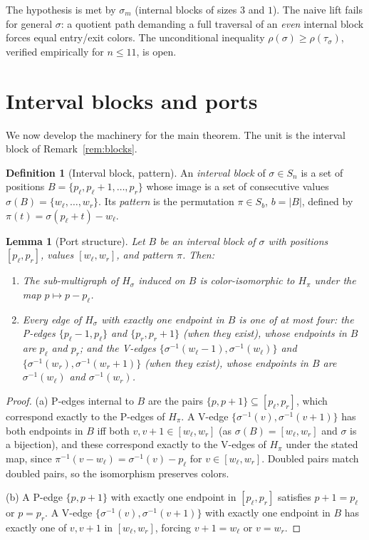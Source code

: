 \documentclass[11pt]{article}
\newtheorem{lemma}[theorem]{Lemma}
\theoremstyle{definition}
\newtheorem{definition}[theorem]{Definition}
\newcommand{\inv}[1]{#1^{-1}}
\begin{document}
The hypothesis is met by $\sigma_m$ (internal blocks of sizes $3$ and $1$). The naive
lift fails for general $\sigma$: a quotient path demanding a full traversal of an
\emph{even} internal block forces equal entry/exit colors. The unconditional inequality
$\rho(\sigma)\ge\rho(\tau_\sigma)$, verified empirically for $n\le11$, is open.

\section{Interval blocks and ports}\label{sec:ports}

We now develop the machinery for the main theorem. The unit is the interval block of
Remark~\ref{rem:blocks}.

\begin{definition}[Interval block, pattern]\label{def:block}
An \emph{interval block} of $\sigma \in S_n$ is a set of positions
$B = \{p_\ell, p_\ell + 1, \dots, p_r\}$ whose image is a set of consecutive values
$\sigma(B) = \{w_\ell, \dots, w_r\}$. Its \emph{pattern} is the permutation
$\pi \in S_b$, $b = |B|$, defined by $\pi(t) = \sigma(p_\ell + t) - w_\ell$.
\end{definition}

\begin{lemma}[Port structure]\label{lem:ports}
Let $B$ be an interval block of $\sigma$ with positions $[p_\ell,p_r]$, values
$[w_\ell,w_r]$, and pattern $\pi$. Then:
\begin{enumerate}
\item[(a)] The sub-multigraph of $H_\sigma$ induced on $B$ is color-isomorphic to
$H_\pi$ under the map $p \mapsto p - p_\ell$.
\item[(b)] Every edge of $H_\sigma$ with exactly one endpoint in $B$ is one of at most
four: the P-edges $\{p_\ell - 1, p_\ell\}$ and $\{p_r, p_r + 1\}$ (when they exist),
whose endpoints in $B$ are $p_\ell$ and $p_r$; and the V-edges
$\{\inv\sigma(w_\ell - 1), \inv\sigma(w_\ell)\}$ and
$\{\inv\sigma(w_r), \inv\sigma(w_r + 1)\}$ (when they exist), whose endpoints in $B$
are $\inv\sigma(w_\ell)$ and $\inv\sigma(w_r)$.
\end{enumerate}
\end{lemma}

\begin{proof}
(a) P-edges internal to $B$ are the pairs $\{p, p+1\} \subseteq [p_\ell, p_r]$, which
correspond exactly to the P-edges of $H_\pi$. A V-edge
$\{\inv\sigma(v), \inv\sigma(v+1)\}$ has both endpoints in $B$ iff both
$v, v+1 \in [w_\ell, w_r]$ (as $\sigma(B) = [w_\ell, w_r]$ and $\sigma$ is a
bijection), and these correspond exactly to the V-edges of $H_\pi$ under the stated
map, since $\inv\pi(v - w_\ell) = \inv\sigma(v) - p_\ell$ for $v \in [w_\ell, w_r]$.
Doubled pairs match doubled pairs, so the isomorphism preserves colors.

(b) A P-edge $\{p, p+1\}$ with exactly one endpoint in $[p_\ell, p_r]$ satisfies
$p + 1 = p_\ell$ or $p = p_r$. A V-edge $\{\inv\sigma(v), \inv\sigma(v+1)\}$ with
exactly one endpoint in $B$ has exactly one of $v, v+1$ in $[w_\ell, w_r]$, forcing
$v + 1 = w_\ell$ or $v = w_r$.
\end{proof}
\end{document}
